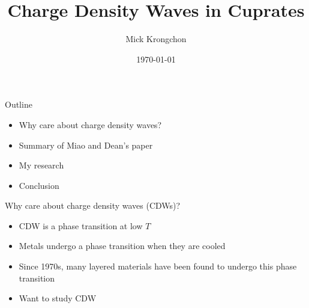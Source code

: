 \documentclass{beamer}
\title[]{Charge Density Waves in Cuprates}
\author{Mick Krongchon}
\institute{University of Illinois at Urbana-Champaign}
\date{\today}
\begin{document}
\begin{frame}
\titlepage
\end{frame}

\begin{frame}{Outline}
\begin{itemize}
\item Why care about charge density waves?
\item Summary of Miao and Dean's paper
\item My research
\item Conclusion
\end{itemize}
\end{frame}

\begin{frame}{Why care about charge density waves (CDWs)?}
\begin{itemize}
\item CDW is a phase transition at low $T$
\item Metals undergo a phase transition when they are cooled
\item Since 1970s, many layered materials have been found to undergo this phase transition
\item Want to study CDW
\end{itemize}
\end{frame}

\end{document}

